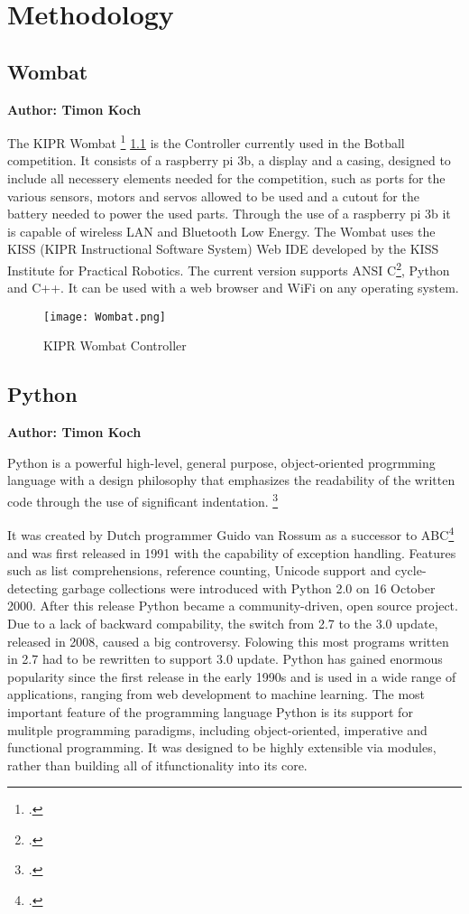 \chapter{Methodology}

\section{Wombat}
\textbf{Author: Timon Koch}

The KIPR Wombat \footcite{wombat-controller} \ref{fig:wombat} is the Controller currently used in the Botball competition. It consists of a raspberry pi 3b, a display and a casing, designed to include all necessery elements needed for the competition, such as ports for the various sensors, motors and servos allowed to be used and a cutout for the battery needed to power the used parts. Through the use of a raspberry pi 3b it is capable of wireless LAN and Bluetooth Low Energy. The Wombat uses the KISS (KIPR Instructional Software System) Web IDE developed by the KISS Institute for Practical Robotics. The current version supports ANSI C\footcite{ansi_c_standard}, Python and C++. It can be used with a web browser and WiFi on any operating system.

\begin{figure}[h]
	\centering
	\texttt{[image: Wombat.png]} 
	\caption{KIPR Wombat Controller}
    \label{fig:wombat}
\end{figure}


\section{Python}
\textbf{Author: Timon Koch}

Python is a powerful high-level, general purpose, object-oriented progrmming language with a design philosophy that emphasizes the readability of the written code through the use of significant indentation. \footcite{python_main_site} 

It was created by Dutch programmer Guido van Rossum as a successor to ABC\footcite{abc_programming_language} and was first released in 1991 with the capability of exception handling. 
Features such as list comprehensions, reference counting, Unicode support and cycle-detecting garbage collections were introduced with Python 2.0 on 16 October 2000. After this release Python became a community-driven, open source project.
Due to a lack of backward compability, the switch from 2.7 to the 3.0 update, released in 2008, caused a big controversy. Folowing this most programs written in 2.7 had to be rewritten to support 3.0 update. 
Python has gained enormous popularity since the first release in the early 1990s and is used in a wide range of applications, ranging from web development to machine learning. 
The most important feature of the programming language Python is its support for mulitple programming paradigms, including object-oriented, imperative and functional programming. It was designed to be highly extensible via modules, rather than building all of itfunctionality into its core.


